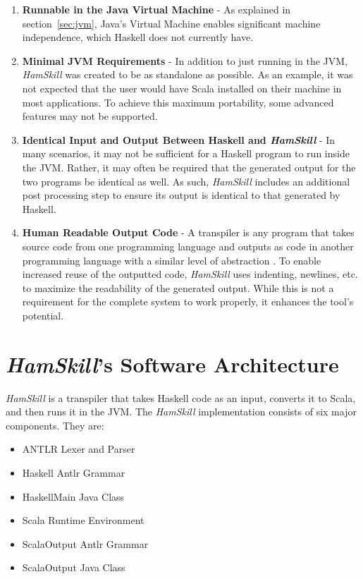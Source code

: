 \documentclass{report}
\begin{document}
\begin{enumerate}

\item \textbf{Runnable in the Java Virtual Machine} - As explained in section~\ref{sec:jvm}, Java's Virtual Machine enables significant machine independence, which Haskell does not currently have.

\item \textbf{Minimal JVM Requirements} - In addition to just running in the JVM, \textit{HamSkill} was created to be as standalone as possible.  As an example, it was not expected that the user would have Scala installed on their machine in most applications.  To achieve this maximum portability, some advanced features may not be supported.

\item \textbf{Identical Input and Output Between Haskell and \emph{HamSkill}} - In many scenarios, it may not be sufficient for a Haskell program to run inside the JVM.  Rather, it may often be required that the generated output for the two programs be identical as well.  As such, \emph{HamSkill} includes an additional post processing step to ensure its output is identical to that generated by Haskell.

\item \textbf{Human Readable Output Code} - A transpiler is any program that takes source code from one programming language and outputs as code in another programming language with a similar level of abstraction \cite{jansen_2015}.  To enable increased reuse of the outputted code, \textit{HamSkill} uses indenting, newlines, etc. to maximize the readability of the generated output.  While this is not a requirement for the complete system to work properly, it enhances the tool's potential.

\end{enumerate}

\section{\textit{HamSkill}'s Software Architecture}\label{sec:hamskillSoftwareArchitecture}

\emph{HamSkill} is a transpiler that takes Haskell code as an input, converts it to Scala, and then runs it in the JVM.  The \emph{HamSkill} implementation consists of six major components.  They are:

\begin{itemize}
   \item ANTLR Lexer and Parser
   \item Haskell Antlr Grammar
   \item HaskellMain Java Class
   \item Scala Runtime Environment
   \item ScalaOutput Antlr Grammar
   \item ScalaOutput Java Class
\end{itemize}
\end{document}

